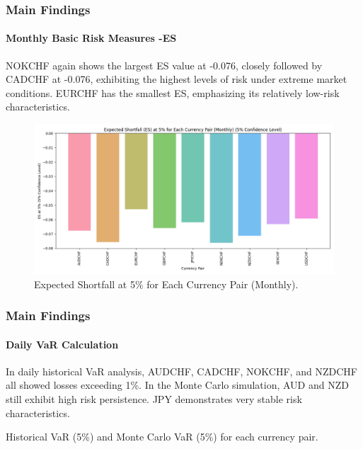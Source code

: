 \documentclass[10pt]{beamer}
\begin{document}
\begin{frame}
\frametitle{Main Findings}
\framesubtitle{Monthly Basic Risk Measures -ES}
NOKCHF again shows the largest ES value at -0.076, closely followed by CADCHF at -0.076, exhibiting the highest levels of risk under extreme market conditions. EURCHF has the smallest ES, emphasizing its relatively low-risk characteristics.
\begin{figure}[h]
    \centering   \includegraphics[width=0.9\linewidth]{../../reports/figures/ES_5_percent_plot.png}
    \caption{\footnotesize Expected Shortfall at 5\% for Each Currency Pair (Monthly).}
    \label{fig:month_es_plot}
\end{figure}
\end{frame}
\begin{frame}
\frametitle{Main Findings}
\framesubtitle{Daily VaR Calculation}
In daily historical VaR analysis, AUDCHF, CADCHF, NOKCHF, and NZDCHF all showed losses exceeding 1\%. In the Monte Carlo simulation, AUD and NZD still exhibit high risk persistence. JPY demonstrates very stable risk characteristics. 
\begin{table}[h]
\centering
\caption{\footnotesize Historical VaR (5\%) and Monte Carlo VaR (5\%) for each currency pair.} 
\label{tab:var_results}
\end{table}
\end{frame}
\end{document}
